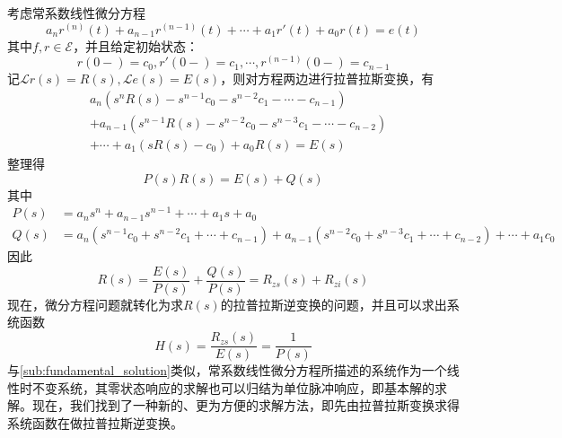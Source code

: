 考虑常系数线性微分方程
\[a_n r^{(n)}(t)+a_{n-1}r^{(n-1)}(t)+\cdots +a_1 r'(t)+a_0 r(t)=e(t)\]
其中$f,r\in\mathcal{E} $，并且给定初始状态：
\[r(0-)=c_0,r'(0-)=c_1,\cdots,r^{(n-1)}(0-)=c_{n-1}\]
记$\mathcal{L} r(s)=R(s),\mathcal{L} e(s)=E(s)$，则对方程两边进行拉普拉斯变换，有
\begin{align*}
    &a_n\left(s^n R(s)-s^{n-1}c_0 -s^{n-2}c_1 -\cdots -c_{n-1}\right)\\
    &+a_{n-1}\left(s^{n-1} R(s)-s^{n-2}c_0 -s^{n-3}c_1 -\cdots -c_{n-2}\right)\\
    &+\cdots +a_1\left(s R(s)-c_0\right)+a_0 R(s)=E(s)
\end{align*}
整理得
\[P(s)R(s)=E(s)+Q(s)\]
其中\begin{align*}
P(s)&=a_n s^n +a_{n-1} s^{n-1}+\cdots +a_1 s+a_0\\
Q(s)&=a_n\left(s^{n-1}c_0 +s^{n-2}c_1 +\cdots +c_{n-1}\right)+a_{n-1}\left(s^{n-2}c_0 +s^{n-3}c_1 +\cdots +c_{n-2}\right)+\cdots +a_1 c_0
\end{align*}
因此
\[R(s)=\frac{E(s)}{P(s)}+\frac{Q(s)}{P(s)}=R_{zs}(s)+R_{zi}(s)\]
现在，微分方程问题就转化为求$R(s)$的拉普拉斯逆变换的问题，并且可以求出系统函数
\[H(s)=\frac{R_{zs}(s)}{E(s)}=\frac{1}{P(s)}\]
与\ref{sub:fundamental_solution}类似，常系数线性微分方程所描述的系统作为一个线性时不变系统，其零状态响应的求解也可以归结为单位脉冲响应，即基本解的求解。现在，我们找到了一种新的、更为方便的求解方法，即先由拉普拉斯变换求得系统函数在做拉普拉斯逆变换。

